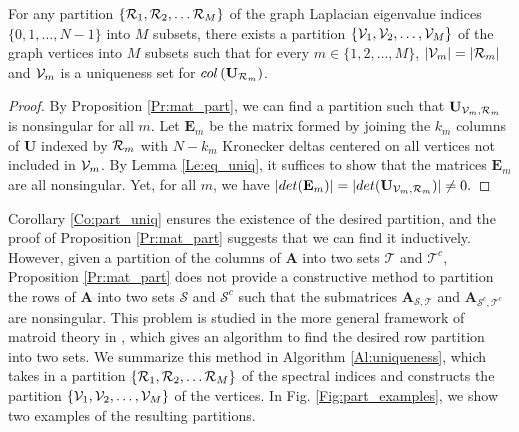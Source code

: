 \documentclass[journal, 10pt]{IEEEtran}
\begin{document}
\begin{corollary}\label{Co:part_uniq}
For any %
partition $\{{\cal R}_1,{\cal R}_2,\ldots {\cal R}_M \}$ of the graph Laplacian eigenvalue indices $\{0,1,\ldots,N-1\}$ into $M$ subsets, there exists a partition $\{{\mathcal{V}}_1,{\mathcal{V}}_2,\ldots,{\mathcal{V}}_M\}$ of the graph vertices into $M$ subsets 
such that for every $m \in \{1,2,\ldots,M\}$, $|\V_m|=|{\cal R}_m|$ and 
${\mathcal{V}}_m$ is a uniqueness set for $\mbox{col}\left(\mathbf{U}_{{\cal R}_m}\right)$.%
\end{corollary}
\begin{proof}
By Proposition \ref{Pr:mat_part}, we can find a partition such that $\mathbf{U}_{\V_m,{\cal R}_m}$ is nonsingular for all $m$. Let $\mathbf{E}_m$ be the matrix formed by joining the $k_m$ columns of  $\mathbf{U}$ indexed by ${\cal R}_m$ with $N-k_m$ Kronecker deltas centered on all vertices not included in ${\mathcal{V}}_m$. By Lemma \ref{Le:eq_uniq}, it suffices to show that the matrices $\mathbf{E}_m$ are all nonsingular. Yet, for all $m$, we have
$|\mbox{det}(\mathbf{E}_m)|=|\mbox{det}(\mathbf{U}_{\V_m,{\cal R}_m})| \neq 0.$
\end{proof}

Corollary \ref{Co:part_uniq} ensures the existence of the desired partition, and the proof of Proposition \ref{Pr:mat_part} suggests that we can find it inductively. However, given a partition of the columns of ${\mathbf{A}}$ into two sets $\mathcal{T}$ and $\mathcal{T}^c$, Proposition \ref{Pr:mat_part} does not provide a constructive method to partition the rows of ${\mathbf{A}}$ into two sets $\mathcal{S}$ and $\mathcal{S}^c$ such that the submatrices ${\mathbf{A}}_{{\mathcal{S}},{\mathcal{T}}}$ and ${\mathbf{A}}_{{\mathcal{S}^c},{\mathcal{T}}^c}$ are nonsingular. This problem is studied in the more general framework of matroid theory in \cite{greene_magnanti}, which gives an algorithm to find the desired row partition into two sets. We summarize this method in Algorithm \ref{Al:uniqueness}, which takes in a partition $\{{\cal R}_1,{\cal R}_2,\ldots {\cal R}_M \}$ of the spectral indices and constructs the partition $\{{\mathcal{V}}_1,{\mathcal{V}}_2,\ldots,{\mathcal{V}}_M\}$ of the vertices. In Fig. \ref{Fig:part_examples}, we show two examples of the resulting partitions.
\end{document}
